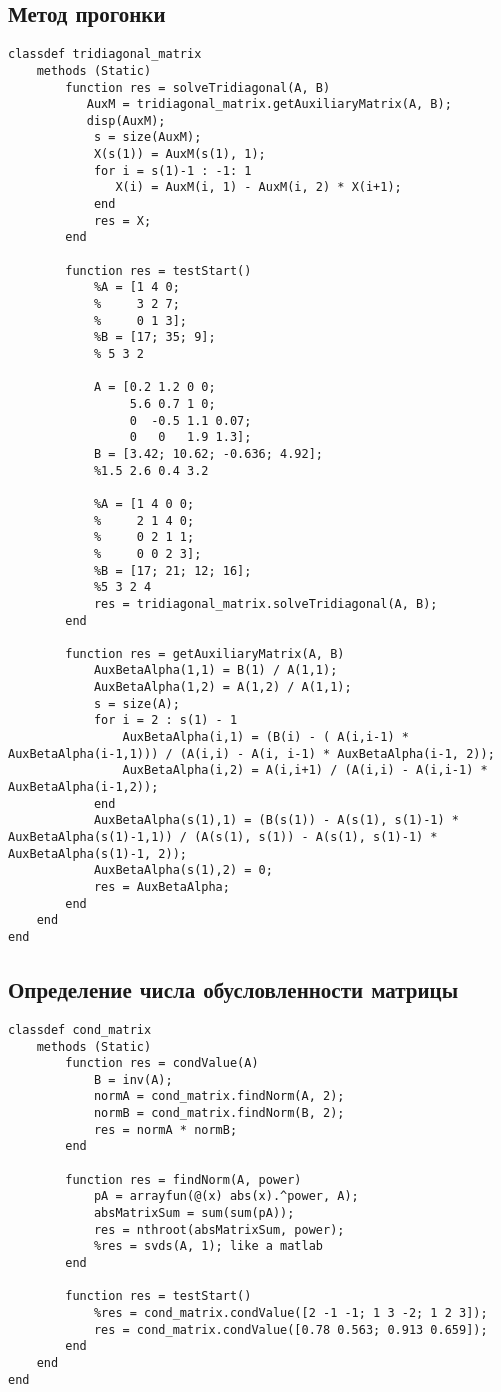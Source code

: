 \documentclass{article}
\begin{document}
\subsection{Метод прогонки}
\begin{lstlisting}
classdef tridiagonal_matrix 
    methods (Static)
        function res = solveTridiagonal(A, B)
           AuxM = tridiagonal_matrix.getAuxiliaryMatrix(A, B);
           disp(AuxM);
            s = size(AuxM);
            X(s(1)) = AuxM(s(1), 1);
            for i = s(1)-1 : -1: 1
               X(i) = AuxM(i, 1) - AuxM(i, 2) * X(i+1);
            end
            res = X;
        end
        
        function res = testStart()
            %A = [1 4 0; 
            %     3 2 7; 
            %     0 1 3];
            %B = [17; 35; 9];
            % 5 3 2
            
            A = [0.2 1.2 0 0;   
                 5.6 0.7 1 0;  
                 0  -0.5 1.1 0.07;  
                 0   0   1.9 1.3];
            B = [3.42; 10.62; -0.636; 4.92];
            %1.5 2.6 0.4 3.2
            
            %A = [1 4 0 0;    
            %     2 1 4 0;  
            %     0 2 1 1;  
            %     0 0 2 3];
            %B = [17; 21; 12; 16];
            %5 3 2 4
            res = tridiagonal_matrix.solveTridiagonal(A, B);
        end

        function res = getAuxiliaryMatrix(A, B)
            AuxBetaAlpha(1,1) = B(1) / A(1,1);
            AuxBetaAlpha(1,2) = A(1,2) / A(1,1);
            s = size(A);
            for i = 2 : s(1) - 1 
                AuxBetaAlpha(i,1) = (B(i) - ( A(i,i-1) * AuxBetaAlpha(i-1,1))) / (A(i,i) - A(i, i-1) * AuxBetaAlpha(i-1, 2));
                AuxBetaAlpha(i,2) = A(i,i+1) / (A(i,i) - A(i,i-1) * AuxBetaAlpha(i-1,2)); 
            end
            AuxBetaAlpha(s(1),1) = (B(s(1)) - A(s(1), s(1)-1) * AuxBetaAlpha(s(1)-1,1)) / (A(s(1), s(1)) - A(s(1), s(1)-1) * AuxBetaAlpha(s(1)-1, 2));
            AuxBetaAlpha(s(1),2) = 0;
            res = AuxBetaAlpha;
        end
    end
end
\end{lstlisting}
\subsection{Определение числа обусловленности матрицы}
\begin{lstlisting}
classdef cond_matrix 
    methods (Static)
        function res = condValue(A)
            B = inv(A);
            normA = cond_matrix.findNorm(A, 2);
            normB = cond_matrix.findNorm(B, 2);
            res = normA * normB;
        end

        function res = findNorm(A, power)
            pA = arrayfun(@(x) abs(x).^power, A);
            absMatrixSum = sum(sum(pA));
            res = nthroot(absMatrixSum, power);
            %res = svds(A, 1); like a matlab
        end
        
        function res = testStart()
            %res = cond_matrix.condValue([2 -1 -1; 1 3 -2; 1 2 3]);
            res = cond_matrix.condValue([0.78 0.563; 0.913 0.659]);
        end
    end
end
\end{lstlisting}
\end{document}
